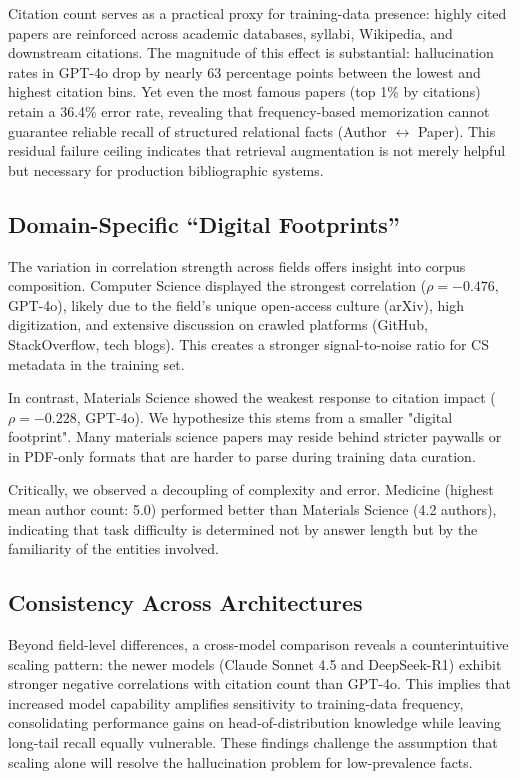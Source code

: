 \documentclass[11pt]{article}
\begin{document}
Citation count serves as a practical proxy for training-data presence: highly cited papers are reinforced across academic databases, syllabi, Wikipedia, and downstream citations. The magnitude of this effect is substantial: hallucination rates in GPT-4o drop by nearly 63 percentage points between the lowest and highest citation bins. Yet even the most famous papers (top 1\% by citations) retain a 36.4\% error rate, revealing that frequency-based memorization cannot guarantee reliable recall of structured relational facts (Author $\leftrightarrow$ Paper). This residual failure ceiling indicates that retrieval augmentation is not merely helpful but necessary for production bibliographic systems.

\subsection{Domain-Specific ``Digital Footprints''}

The variation in correlation strength across fields offers insight into corpus composition. Computer Science displayed the strongest correlation ($\rho = -0.476$, GPT-4o), likely due to the field's unique open-access culture (arXiv), high digitization, and extensive discussion on crawled platforms (GitHub, StackOverflow, tech blogs). This creates a stronger signal-to-noise ratio for CS metadata in the training set.

In contrast, Materials Science showed the weakest response to citation impact ($\rho = -0.228$, GPT-4o). We hypothesize this stems from a smaller "digital footprint". Many materials science papers may reside behind stricter paywalls or in PDF-only formats that are harder to parse during training data curation.

Critically, we observed a decoupling of complexity and error. Medicine (highest mean author count: 5.0) performed better than Materials Science (4.2 authors), indicating that task difficulty is determined not by answer length but by the familiarity of the entities involved.

\subsection{Consistency Across Architectures}

Beyond field-level differences, a cross-model comparison reveals a counterintuitive scaling pattern: the newer models (Claude Sonnet 4.5 and DeepSeek-R1) exhibit stronger negative correlations with citation count than GPT-4o. This implies that increased model capability amplifies sensitivity to training-data frequency, consolidating performance gains on head-of-distribution knowledge while leaving long-tail recall equally vulnerable. These findings challenge the assumption that scaling alone will resolve the hallucination problem for low-prevalence facts.
\end{document}
